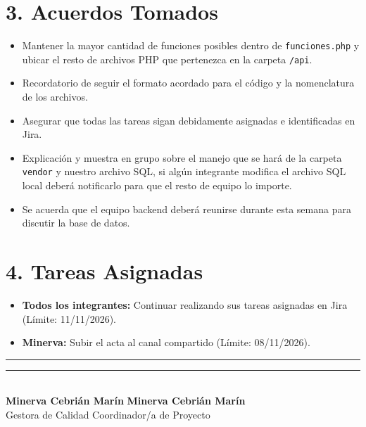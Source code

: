 \section*{3. Acuerdos Tomados}
\begin{itemize}
\item Mantener la mayor cantidad de funciones posibles dentro de \texttt{funciones.php} y ubicar el resto de archivos PHP que pertenezca en la carpeta \texttt{/api}.
\item Recordatorio de seguir el formato acordado para el código y la nomenclatura de los archivos.
\item Asegurar que todas las tareas sigan debidamente asignadas e identificadas en Jira.
\item Explicación y muestra en grupo sobre el manejo que se hará de la carpeta \texttt{vendor} y nuestro archivo SQL, si algún integrante modifica el archivo SQL local deberá notificarlo para que el resto de equipo lo importe.
\item Se acuerda que el equipo backend deberá reunirse durante esta semana para discutir la base de datos.
\end{itemize}

\section*{4. Tareas Asignadas}
\begin{itemize}
\item \textbf{Todos los integrantes:} Continuar realizando sus tareas asignadas en Jira (Límite: 11/11/2026).
\item \textbf{Minerva:} Subir el acta al canal compartido (Límite: 08/11/2026).
\end{itemize}
\noindent
\rule{6cm}{0.4pt} \hfill \rule{6cm}{0.4pt}\\
\textbf{Minerva Cebrián Marín} \hfill \textbf{Minerva Cebrián Marín}\\
Gestora de Calidad \hfill Coordinador/a de Proyecto
